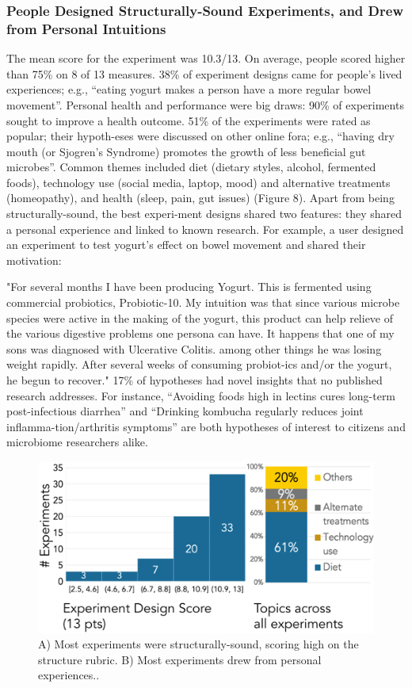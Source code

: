 \subsubsection{People Designed Structurally-Sound Experiments, and Drew from Personal Intuitions}
The mean score for the experiment was 10.3/13. On average, people scored higher than 75\% on 8 of 13 measures. 38\% of experiment designs came for people’s lived experiences; e.g., “eating yogurt makes a person have a more regular bowel movement”. Personal health and performance were big draws: 90\% of experiments sought to improve a health outcome. 
51\% of the experiments were rated as popular; their hypoth-eses were discussed on other online fora; e.g., “having dry mouth (or Sjogren's Syndrome) promotes the growth of less beneficial gut microbes”. Common themes included diet (dietary styles, alcohol, fermented foods), technology use (social media, laptop, mood) and alternative treatments (homeopathy), and health (sleep, pain, gut issues) (Figure 8). Apart from being structurally-sound, the best experi-ment designs shared two features: they shared a personal experience and linked to known research. For example, a user designed an experiment to test yogurt’s effect on bowel movement and shared their motivation: 

"For several months I have been producing Yogurt. This is fermented using commercial probiotics, Probiotic-10. My intuition was that since various microbe species were active in the making of the yogurt, this product can help relieve of the various digestive problems one persona can have. It happens that one of my sons was diagnosed with Ulcerative Colitis. among other things he was losing weight rapidly. After several weeks of consuming probiot-ics and/or the yogurt, he begun to recover."
17\% of hypotheses had novel insights that no published research addresses. For instance, “Avoiding foods high in lectins cures long-term post-infectious diarrhea” and “Drinking kombucha regularly reduces joint inflamma-tion/arthritis symptoms” are both hypotheses of interest to citizens and microbiome researchers alike.

\begin{figure}[h] 
\centering
  \includegraphics[width=1.0\textwidth]{figures/galileo/galileo-study2-1}
  \caption[]
{A) Most experiments were structurally-sound, scoring high on the structure rubric. B) Most experiments drew from personal experiences.. }
  \label{fig:galileo-result2}
\end{figure}

